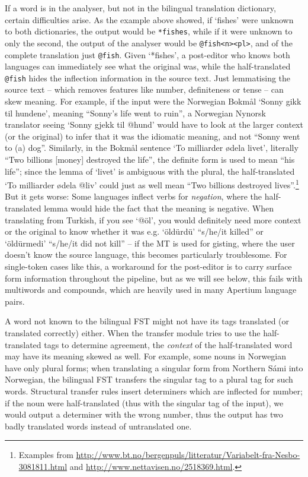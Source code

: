 \documentclass[10pt, a4paper]{article}
\newcommand{\ana}[1]{\texttt{#1}}
\newcommand{\f}[1]{`#1'}
\begin{document}
If a word is in the analyser, but not in the bilingual translation
dictionary, certain difficulties arise. As the example above showed,
if \f{fishes} were unknown to both dictionaries, the output would be
\ana{*fishes}, while if it were unknown to only the second, the output
of the analyser would be \ana{@fish<n><pl>}, and of the complete
translation just \ana{@fish}. Given \f{*fishes}, a post-editor who
knows both languages can immediately see what the original was, while
the half-translated \ana{@fish} hides the inflection information in
the source text. Just lemmatising the source text – which removes
features like number, definiteness or tense – can skew meaning. For
example, if the input were the Norwegian Bokmål \f{Sonny gikk til
  hundene}, meaning ``Sonny's life went to ruin'', a Norwegian Nynorsk
translator seeing \f{Sonny gjekk til @hund} would have to look at the
larger context (or the original) to infer that it was the idiomatic
meaning, and not ``Sonny went to (a) dog''. Similarly, in the Bokmål
sentence \f{To milliarder ødela livet}, literally ``Two billions
[money] destroyed the life'', the definite form is used to mean ``his
life''; since the lemma of \f{livet} is ambiguous with the plural, the
half-translated \f{To milliarder ødela @liv} could just as well mean
``Two billions destroyed lives''.\footnote{Examples from
  \href{http://www.bt.no/bergenpuls/litteratur/Variabelt-fra-Nesbo-3081811.html}{http://www.bt.no/bergenpuls/litteratur/Variabelt-fra-Nesbo-3081811.html}
  and
  \href{http://www.nettavisen.no/2518369.html}{http://www.nettavisen.no/2518369.html}.}
But it gets worse: Some languages inflect verbs for \emph{negation},
where the half-translated lemma would hide the fact that the meaning
is negative. When translating from Turkish, if you see \f{@öl}, you
would definitely need more context or the original to know whether it
was e.g. \f{öldürdü} ``s/he/it killed'' or \f{öldürmedi} ``s/he/it did
not kill'' – if the MT is used for gisting, where the user doesn't
know the source language, this becomes particularly troublesome. For
single-token cases like this, a workaround for the post-editor is to
carry surface form information throughout the pipeline, but as we will
see below, this fails with multiwords and compounds, which are heavily
used in many Apertium language pairs.

A word not known to the bilingual FST might not have its tags
translated (or translated correctly) either. When the transfer module
tries to use the half-translated tags to determine agreement, the
\emph{context} of the half-translated word may have its meaning skewed
as well. For example, some nouns in Norwegian have only plural forms;
when translating a singular form from Northern Sámi into Norwegian,
the bilingual FST transfers the singular tag to a plural tag for such
words. Structural transfer rules insert determiners which are
inflected for number; if the noun were half-translated (thus with the
singular tag of the input), we would output a determiner with the
wrong number, thus the output has two badly translated words instead
of untranslated one.
\end{document}
